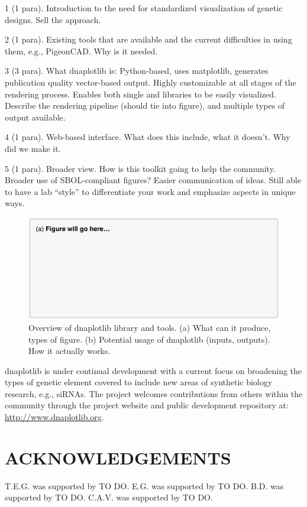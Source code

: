 \documentclass{bioinfo}
\begin{document}
1 (1 para). Introduction to the need for standardized visualization of genetic designs. Sell the approach.

2 (1 para). Existing tools that are available and the current difficulties in using them, e.g., PigeonCAD. Why is it needed.

3 (3 para). What dnaplotlib is: Python-based, uses matplotlib, generates publication quality vector-based output. Highly customizable at all stages of the rendering process. Enables both single and libraries to be easily visualized. Describe the rendering pipeline (should tie into figure), and multiple types of output available.

4 (1 para). Web-based interface. What does this include, what it doesn't. Why did we make it.

5 (1 para). Broader view. How is this toolkit going to help the community. Broader use of SBOL-compliant figures? Easier communication of ideas. Still able to have a lab ``style'' to differentiate your work and emphasize aspects in unique ways.

\begin{figure}[t]
\centering
\includegraphics[width=\textwidth]{Figure1.pdf}
\caption{\label{fig:overview}Overview of dnaplotlib library and tools. (a) What can it produce, types of figure. (b) Potential usage of dnaplotlib (inputs, outputs). How it actually works.}
\end{figure}

dnaplotlib is under continual development with a current focus on broadening the types of genetic element covered to include new areas of synthetic biology research, e.g., siRNAs. The project welcomes contributions from others within the community through the project website and public development repository at: \href{http://www.dnaplotlib.org}{http://www.dnaplotlib.org}.

\section*{ACKNOWLEDGEMENTS}
T.E.G. was supported by TO DO. E.G. was supported by TO DO. B.D. was supported by TO DO. C.A.V. was supported by TO DO.
\end{document}
